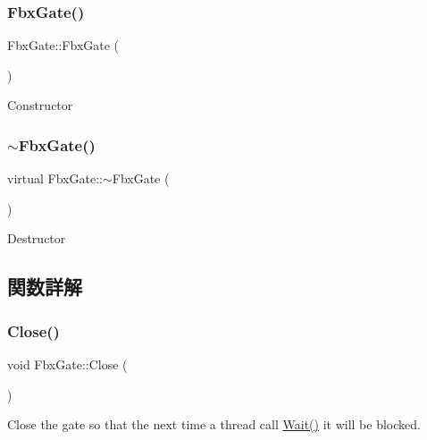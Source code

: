 \subsubsection{\texorpdfstring{Fbx\+Gate()}{FbxGate()}}
{\footnotesize\ttfamily Fbx\+Gate\+::\+Fbx\+Gate (\begin{DoxyParamCaption}{ }\end{DoxyParamCaption})}



Constructor 

\mbox{\label{class_fbx_gate_a588ebab279f8bd182bc0a1aeb6001554}} 
\subsubsection{\texorpdfstring{$\sim$\+Fbx\+Gate()}{~FbxGate()}}
{\footnotesize\ttfamily virtual Fbx\+Gate\+::$\sim$\+Fbx\+Gate (\begin{DoxyParamCaption}{ }\end{DoxyParamCaption})\hspace{0.3cm}{\ttfamily [virtual]}}



Destructor 



\subsection{関数詳解}
\mbox{\label{class_fbx_gate_aa91ba9c41757e0065d400f254a5175ee}} 
\subsubsection{\texorpdfstring{Close()}{Close()}}
{\footnotesize\ttfamily void Fbx\+Gate\+::\+Close (\begin{DoxyParamCaption}{ }\end{DoxyParamCaption})}

Close the gate so that the next time a thread call \hyperlink{class_fbx_gate_ad3d9e530f43a6f446c2d09364153c918}{Wait()} it will be blocked. \mbox{\label{class_fbx_gate_a96baa45cb4fa4a655201355601b6bc47}} 
